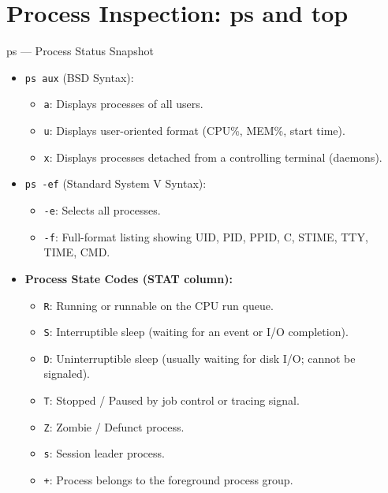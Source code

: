 \section{Process Inspection: ps and top}
\begin{commandbox}{ps --- Process Status Snapshot}
\begin{itemize}[leftmargin=1.5em]
    \item \texttt{ps aux} (BSD Syntax):
    \begin{itemize}
        \item \texttt{a}: Displays processes of all users.
        \item \texttt{u}: Displays user-oriented format (CPU\%, MEM\%, start time).
        \item \texttt{x}: Displays processes detached from a controlling terminal (daemons).
    \end{itemize}
    \item \texttt{ps -ef} (Standard System V Syntax):
    \begin{itemize}
        \item \texttt{-e}: Selects all processes.
        \item \texttt{-f}: Full-format listing showing UID, PID, PPID, C, STIME, TTY, TIME, CMD.
    \end{itemize}
    \item \textbf{Process State Codes (STAT column):}
    \begin{itemize}
        \item \texttt{R}: Running or runnable on the CPU run queue.
        \item \texttt{S}: Interruptible sleep (waiting for an event or I/O completion).
        \item \texttt{D}: Uninterruptible sleep (usually waiting for disk I/O; cannot be signaled).
        \item \texttt{T}: Stopped / Paused by job control or tracing signal.
        \item \texttt{Z}: Zombie / Defunct process.
        \item \texttt{s}: Session leader process.
        \item \texttt{+}: Process belongs to the foreground process group.
    \end{itemize}
\end{itemize}
\end{commandbox}

